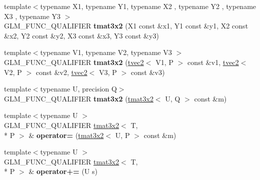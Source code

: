 \begin{DoxyCompactItemize}
\item 
\hypertarget{structglm_1_1detail_1_1tmat3x2_ae3a805c23b230b65cc49d3a3d7ca027a}{{\footnotesize template$<$typename X1, typename Y1, typename X2 , typename Y2 , typename X3 , typename Y3 $>$ }\\G\-L\-M\-\_\-\-F\-U\-N\-C\-\_\-\-Q\-U\-A\-L\-I\-F\-I\-E\-R {\bfseries tmat3x2} (X1 const \&x1, Y1 const \&y1, X2 const \&x2, Y2 const \&y2, X3 const \&x3, Y3 const \&y3)}\label{structglm_1_1detail_1_1tmat3x2_ae3a805c23b230b65cc49d3a3d7ca027a}

\item 
\hypertarget{structglm_1_1detail_1_1tmat3x2_a701537988a37657db53fd40d9b68d364}{{\footnotesize template$<$typename V1, typename V2, typename V3 $>$ }\\G\-L\-M\-\_\-\-F\-U\-N\-C\-\_\-\-Q\-U\-A\-L\-I\-F\-I\-E\-R {\bfseries tmat3x2} (\hyperlink{structglm_1_1detail_1_1tvec2}{tvec2}$<$ V1, P $>$ const \&v1, \hyperlink{structglm_1_1detail_1_1tvec2}{tvec2}$<$ V2, P $>$ const \&v2, \hyperlink{structglm_1_1detail_1_1tvec2}{tvec2}$<$ V3, P $>$ const \&v3)}\label{structglm_1_1detail_1_1tmat3x2_a701537988a37657db53fd40d9b68d364}

\item 
\hypertarget{structglm_1_1detail_1_1tmat3x2_a81e00e89a4ebf83f1b74bbbc79f5f795}{{\footnotesize template$<$typename U, precision Q$>$ }\\G\-L\-M\-\_\-\-F\-U\-N\-C\-\_\-\-Q\-U\-A\-L\-I\-F\-I\-E\-R {\bfseries tmat3x2} (\hyperlink{structglm_1_1detail_1_1tmat3x2}{tmat3x2}$<$ U, Q $>$ const \&m)}\label{structglm_1_1detail_1_1tmat3x2_a81e00e89a4ebf83f1b74bbbc79f5f795}

\item 
\hypertarget{structglm_1_1detail_1_1tmat3x2_a309bf07e7e7ba0f6f356d5848407602c}{{\footnotesize template$<$typename U $>$ }\\G\-L\-M\-\_\-\-F\-U\-N\-C\-\_\-\-Q\-U\-A\-L\-I\-F\-I\-E\-R \hyperlink{structglm_1_1detail_1_1tmat3x2}{tmat3x2}$<$ T, \\*
P $>$ \& {\bfseries operator=} (\hyperlink{structglm_1_1detail_1_1tmat3x2}{tmat3x2}$<$ U, P $>$ const \&m)}\label{structglm_1_1detail_1_1tmat3x2_a309bf07e7e7ba0f6f356d5848407602c}

\item 
\hypertarget{structglm_1_1detail_1_1tmat3x2_a66decc5a8a5a5001d207abeedf367e2a}{{\footnotesize template$<$typename U $>$ }\\G\-L\-M\-\_\-\-F\-U\-N\-C\-\_\-\-Q\-U\-A\-L\-I\-F\-I\-E\-R \hyperlink{structglm_1_1detail_1_1tmat3x2}{tmat3x2}$<$ T, \\*
P $>$ \& {\bfseries operator+=} (U s)}\label{structglm_1_1detail_1_1tmat3x2_a66decc5a8a5a5001d207abeedf367e2a}


\end{DoxyCompactItemize}
